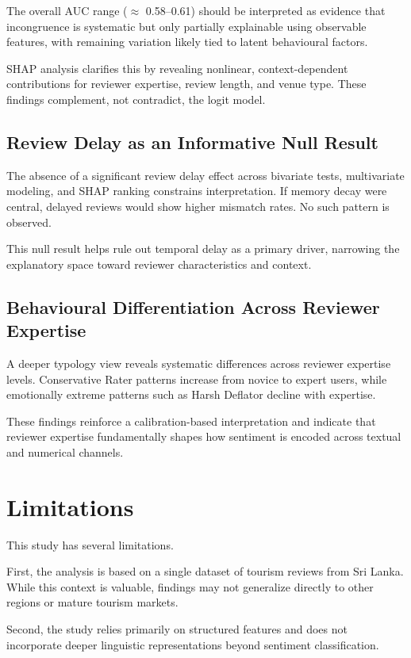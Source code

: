 \documentclass[conference]{IEEEtran}
\begin{document}
The overall AUC range ($\approx$ 0.58--0.61) should be interpreted as evidence that incongruence is systematic but only partially explainable using observable features, with remaining variation likely tied to latent behavioural factors.

SHAP analysis clarifies this by revealing nonlinear, context-dependent contributions for reviewer expertise, review length, and venue type. These findings complement, not contradict, the logit model.

\subsection{Review Delay as an Informative Null Result}
The absence of a significant review delay effect across bivariate tests, multivariate modeling, and SHAP ranking constrains interpretation. If memory decay were central, delayed reviews would show higher mismatch rates. No such pattern is observed.

This null result helps rule out temporal delay as a primary driver, narrowing the explanatory space toward reviewer characteristics and context.

\subsection{Behavioural Differentiation Across Reviewer Expertise}
A deeper typology view reveals systematic differences across reviewer expertise levels. Conservative Rater patterns increase from novice to expert users, while emotionally extreme patterns such as Harsh Deflator decline with expertise.

These findings reinforce a calibration-based interpretation and indicate that reviewer expertise fundamentally shapes how sentiment is encoded across textual and numerical channels.

\section{Limitations}
This study has several limitations.

First, the analysis is based on a single dataset of tourism reviews from Sri Lanka. While this context is valuable, findings may not generalize directly to other regions or mature tourism markets.

Second, the study relies primarily on structured features and does not incorporate deeper linguistic representations beyond sentiment classification.
\end{document}
